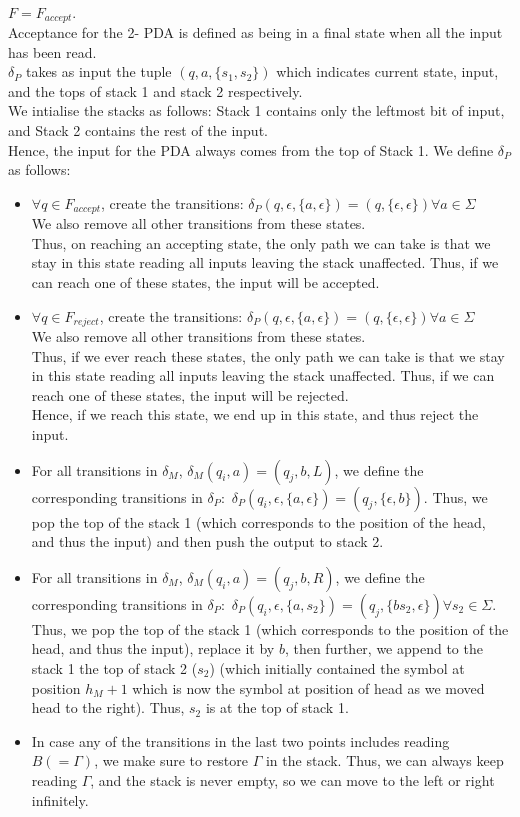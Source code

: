 \documentclass[12pt,a4paper]{article}
\begin{document}
\\ $F = F_{accept}$.
\\Acceptance for the 2- PDA is defined as being in a final state when all the input has been read.
\\$\delta_P$ takes as input the tuple $(q,a,\{s_1,s_2\})$ which indicates current state, input, and the tops of stack 1 and stack 2 respectively. 
\\We intialise the stacks as follows: Stack 1 contains only the leftmost bit of input, and Stack 2 contains the rest of the input.
\\Hence, the input for the PDA always comes from the top of Stack 1.
We define $\delta_P$ as follows:
\begin{itemize}
    \item $ \forall q \in F_{accept}$, create the transitions: $\delta_P(q,\epsilon,\{a,\epsilon\}) = (q,\{\epsilon,\epsilon\}) \forall a \in \Sigma$
    \\We also remove all other transitions from these states.
    \\Thus, on reaching an accepting state, the only path we can take is that we stay in this state reading all inputs leaving the stack unaffected. Thus, if we can reach one of these states, the input will be accepted.
    \item $ \forall q \in F_{reject}$, create the transitions: $\delta_P(q,\epsilon,\{a,\epsilon\}) = (q,\{\epsilon,\epsilon\}) \forall a \in \Sigma$
    \\We also remove all other transitions from these states.
    \\Thus, if we ever reach these states, the only path we can take is that we stay in this state reading all inputs leaving the stack unaffected. Thus, if we can reach one of these states, the input will be rejected.
    \\Hence, if we reach this state, we end up in this state, and thus reject the input.
    \item For all transitions in $\delta_M$, $\delta_M(q_i,a) = (q_j,b,L)$, we define the corresponding transitions in $\delta_P:$ $\delta_P(q_i,\epsilon,\{a,\epsilon\}) = (q_{j},\{\epsilon,b\})$. Thus, we pop the top of the stack 1 (which corresponds to the position of the head, and thus the input) and then push the output to stack 2.
    \item For all transitions in $\delta_M$, $\delta_M(q_i,a) = (q_j,b,R)$, we define the corresponding transitions in $\delta_P:$ $\delta_P(q_i,\epsilon,\{a,s_2\}) = (q_{j},\{bs_2,\epsilon\}) \forall s_2 \in \Sigma$. Thus, we pop the top of the stack 1 (which corresponds to the position of the head, and thus the input), replace it by $b$, then further, we append to the stack 1 the top of stack 2 ($s_2$) (which initially contained the symbol at position $h_M + 1$ which is now the symbol at position of head as we moved head to the right). Thus, $s_2$ is at the top of stack 1.
    \item In case any of the transitions in the last two points includes reading $B ( = \Gamma)$, we make sure to restore $\Gamma$ in the stack. Thus, we can always keep reading $\Gamma$, and the stack is never empty, so we can move to the left or right infinitely.
\end{itemize}
\end{document}
